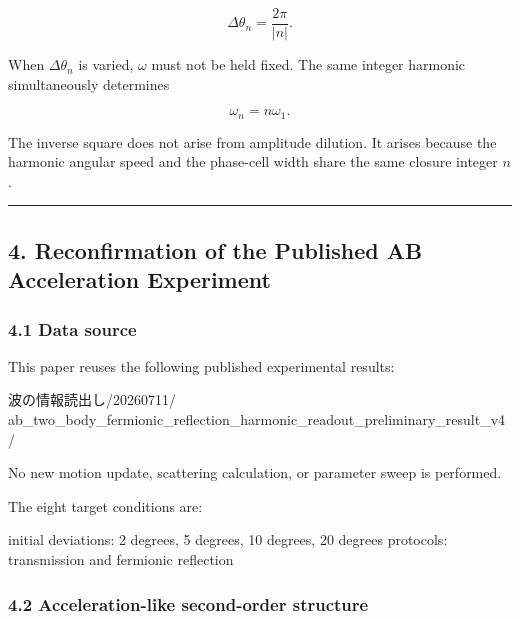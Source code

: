 \documentclass[
  10pt,
  a4paper,
]{article}
\newenvironment{Shaded}{}{}
\newcommand{\NormalTok}[1]{#1}
\begin{document}
\[
\Delta\theta_n=\frac{2\pi}{|n|}.
\]

When \(\Delta\theta_n\) is varied, \(\omega\) must not be held fixed.
The same integer harmonic simultaneously determines

\[
\omega_n=n\omega_1.
\]

The inverse square does not arise from amplitude dilution. It arises
because the harmonic angular speed and the phase-cell width share the
same closure integer \(n\).

\begin{center}\rule{0.5\linewidth}{0.5pt}\end{center}

\subsection{4. Reconfirmation of the Published AB Acceleration
Experiment}\label{reconfirmation-of-the-published-ab-acceleration-experiment}

\subsubsection{4.1 Data source}\label{data-source}

This paper reuses the following published experimental results:

\begin{Shaded}
\begin{Highlighting}[]
\NormalTok{波の情報読出し/20260711/}
\NormalTok{ab\_two\_body\_fermionic\_reflection\_harmonic\_readout\_preliminary\_result\_v4/}
\end{Highlighting}
\end{Shaded}

No new motion update, scattering calculation, or parameter sweep is
performed.

The eight target conditions are:

\begin{Shaded}
\begin{Highlighting}[]
\NormalTok{initial deviations: 2 degrees, 5 degrees, 10 degrees, 20 degrees}
\NormalTok{protocols: transmission and fermionic reflection}
\end{Highlighting}
\end{Shaded}

\subsubsection{4.2 Acceleration-like second-order
structure}\label{acceleration-like-second-order-structure}
\end{document}
